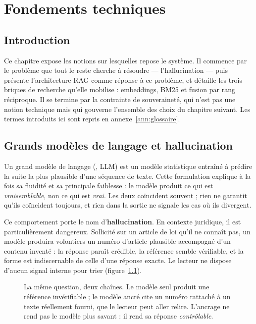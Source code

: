 \chapter{Fondements techniques}
\label{chap:fondements}

\section*{Introduction}

Ce chapitre expose les notions sur lesquelles repose le système. Il commence par le problème que
tout le reste cherche à résoudre --- l'hallucination --- puis présente l'architecture RAG comme
réponse à ce problème, et détaille les trois briques de recherche qu'elle mobilise : embeddings,
BM25 et fusion par rang réciproque. Il se termine par la contrainte de souveraineté, qui
n'est pas une notion technique mais qui gouverne l'ensemble des choix du chapitre suivant. Les
termes introduits ici sont repris en annexe~\ref{ann:glossaire}.

\section{Grands modèles de langage et hallucination}

Un grand modèle de langage (, LLM) est un modèle statistique
entraîné à prédire la suite la plus plausible d'une séquence de texte. Cette formulation explique
à la fois sa fluidité et sa principale faiblesse : le modèle produit ce qui est
\emph{vraisemblable}, non ce qui est \emph{vrai}. Les deux coïncident souvent ; rien ne garantit
qu'ils coïncident toujours, et rien dans la sortie ne signale les cas où ils divergent.

Ce comportement porte le nom d'\textbf{hallucination}. En contexte juridique, il est
particulièrement dangereux. Sollicité sur un article de loi qu'il ne connaît pas, un modèle
produira volontiers un numéro d'article plausible accompagné d'un contenu inventé : la réponse
paraît crédible, la référence semble vérifiable, et la forme est indiscernable de celle d'une
réponse exacte. Le lecteur ne dispose d'aucun signal interne pour trier
(figure~\ref{fig:llm-vs-rag}).

\begin{figure}[htbp]
  \centering
  
  \caption[Modèle seul contre modèle ancré]{La même question, deux chaînes. Le modèle seul
  produit une référence invérifiable ; le modèle ancré cite un numéro rattaché à un texte
  réellement fourni, que le lecteur peut aller relire. L'ancrage ne rend pas le modèle plus
  savant : il rend sa réponse \emph{contrôlable}.}
  \label{fig:llm-vs-rag}
\end{figure}

